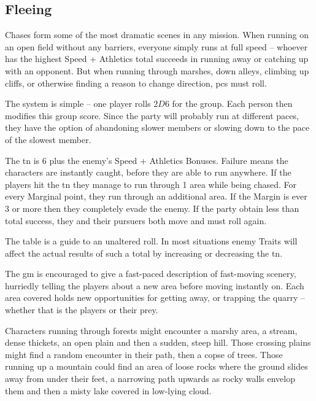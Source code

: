 \begin{multicols}{2}

\begin{figure*}[t]
\chasechart
\end{figure*}

\subsection{Fleeing}

Chases form some of the most dramatic scenes in any mission.
When running on an open field without any barriers, everyone simply runs at full speed -- whoever has the highest Speed + Athletics total succeeds in running away or catching up with an opponent.
But when running through marshes, down alleys, climbing up cliffs, or otherwise finding a reason to change direction, \glspl{pc} must roll.

The system is simple -- one player rolls $2D6$ for the group. Each person then modifies this group score. Since the party will probably run at different paces, they have the option of abandoning slower members or slowing down to the pace of the slowest member.

The \gls{tn} is 6 plus the enemy's Speed + Athletics Bonuses.
Failure means the characters are instantly caught, before they are able to run anywhere.
If the players hit the \gls{tn} they manage to run through 1 area while being chased.
For every Marginal point, they run through an additional area.
If the Margin is ever 3 or more then they completely evade the enemy.
If the party obtain less than total success, they and their pursuers both move and must roll again.

The table is a guide to an unaltered roll. In most situations enemy Traits will affect the actual results of such a total by increasing or decreasing the \gls{tn}.

The \gls{gm} is encouraged to give a fast-paced description of fast-moving scenery, hurriedly telling the players about a new area before moving instantly on.
Each area covered holds new opportunities for getting away, or trapping the quarry -- whether that is the players or their prey.

Characters running through forests might encounter a marshy area, a stream, dense thickets, an open plain and then a sudden, steep hill.
Those crossing plains might find a random encounter in their path, then a copse of trees.
Those running up a mountain could find an area of loose rocks where the ground slides away from under their feet, a narrowing path upwards as rocky walls envelop them and then a misty lake covered in low-lying cloud.


\end{multicols}
